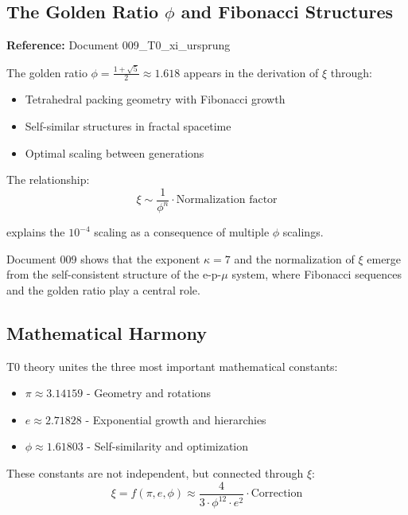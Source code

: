 	\subsection{The Golden Ratio $\phi$ and Fibonacci Structures}
	
	\begin{tcolorbox}[colback=magenta!5!white,colframe=magenta!75!black,title={Geometric Derivation of $\xi$}]
		\textbf{Reference:} Document 009\_T0\_xi\_ursprung
		
		The golden ratio $\phi = \frac{1+\sqrt{5}}{2} \approx 1.618$ appears in the derivation of $\xi$ through:
		
		\begin{itemize}
			\item Tetrahedral packing geometry with Fibonacci growth
			\item Self-similar structures in fractal spacetime
			\item Optimal scaling between generations
		\end{itemize}
		
		The relationship:
		\begin{equation}
			\xi \sim \frac{1}{\phi^n} \cdot \text{Normalization factor}
		\end{equation}
		
		explains the $10^{-4}$ scaling as a consequence of multiple $\phi$ scalings.
		
		Document 009 shows that the exponent $\kappa = 7$ and the normalization of $\xi$ emerge from the self-consistent structure of the e-p-$\mu$ system, where Fibonacci sequences and the golden ratio play a central role.
	\end{tcolorbox}
	
	\subsection{Mathematical Harmony}
	
	T0 theory unites the three most important mathematical constants:
	
	\begin{itemize}
		\item $\pi \approx 3.14159$ - Geometry and rotations
		\item $e \approx 2.71828$ - Exponential growth and hierarchies
		\item $\phi \approx 1.61803$ - Self-similarity and optimization
	\end{itemize}
	
	These constants are not independent, but connected through $\xi$:
	\begin{equation}
		\xi = f(\pi, e, \phi) \approx \frac{4}{3 \cdot \phi^{12} \cdot e^2} \cdot \text{Correction}
	\end{equation}
	
